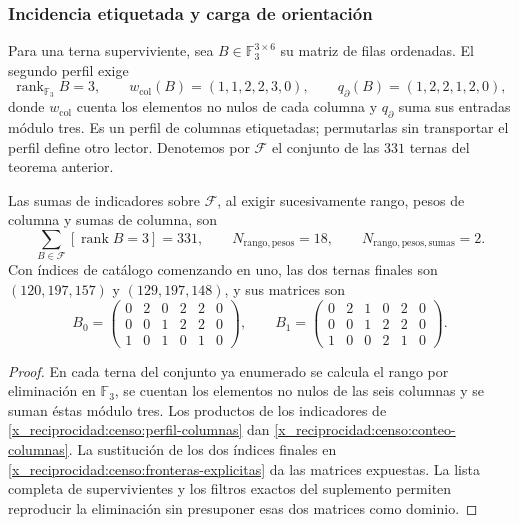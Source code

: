 \subsubsection{Incidencia etiquetada y carga de orientación}

Para una terna superviviente, sea \(B\in\mathbb F_3^{3\times6}\) su
matriz de filas ordenadas. El segundo perfil exige
\begin{equation}
 \operatorname{rank}_{\mathbb F_3}B=3,\qquad
 w_{\mathrm{col}}(B)=(1,1,2,2,3,0),\qquad
 q_{\partial}(B)=(1,2,2,1,2,0),
 \label{x_reciprocidad:censo:perfil-columnas}
\end{equation}
donde \(w_{\mathrm{col}}\) cuenta los elementos no nulos de cada
columna y \(q_{\partial}\) suma sus entradas módulo tres. Es un perfil
de columnas etiquetadas; permutarlas sin transportar el perfil define otro
lector. Denotemos por \(\mathcal F\) el conjunto de las \(331\) ternas
del teorema anterior.

\begin{proposition}
\label{x_reciprocidad:censo:dos-matrices}
Las sumas de indicadores sobre \(\mathcal F\), al exigir sucesivamente
rango, pesos de columna y sumas de columna, son
\begin{equation}
 \sum_{B\in\mathcal F}[\operatorname{rank}B=3]=331,
 \qquad N_{\mathrm{rango,pesos}}=18,
 \qquad N_{\mathrm{rango,pesos,sumas}}=2.
 \label{x_reciprocidad:censo:conteo-columnas}
\end{equation}
Con índices de catálogo comenzando en uno, las dos ternas finales son
\((120,197,157)\) y \((129,197,148)\), y sus matrices son
\[
 B_0=\begin{pmatrix}0&2&0&2&2&0\\0&0&1&2&2&0\\1&0&1&0&1&0\end{pmatrix},
 \qquad
 B_1=\begin{pmatrix}0&2&1&0&2&0\\0&0&1&2&2&0\\1&0&0&2&1&0\end{pmatrix}.
\]
\end{proposition}
\begin{proof}
En cada terna del conjunto ya enumerado se calcula el rango por eliminación
en \(\mathbb F_3\), se cuentan los elementos no nulos de las seis
columnas y se suman éstas módulo tres. Los productos de los indicadores
de \eqref{x_reciprocidad:censo:perfil-columnas} dan \eqref{x_reciprocidad:censo:conteo-columnas}.
La sustitución de los dos índices finales en
\eqref{x_reciprocidad:censo:fronteras-explicitas} da las matrices expuestas. La lista
completa de supervivientes y los filtros exactos del suplemento permiten
reproducir la eliminación sin presuponer esas dos matrices como dominio.
\end{proof}

